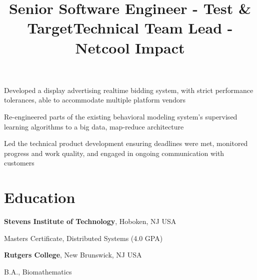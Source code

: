 \documentclass[margin,line]{resume}
\newenvironment{bullet-list}{
  \begin{list}{$\bullet$}{%
      \setlength{\itemsep}{0in}
      \setlength{\parsep}{0in} \setlength{\parskip}{0in}
      \setlength{\topsep}{0in} \setlength{\partopsep}{0in}
      \setlength{\leftmargin}{0.2in}}}{\end{list}}
\begin{document}
\begin{resume}
\title{Senior Software Engineer - Test \& Target}
\begin{position}
\vspace{-.3cm}
\begin{bullet-list}
\item Developed a display advertising realtime bidding system, with strict
performance tolerances, able to accommodate multiple platform vendors
\item Re-engineered parts of the existing behavioral modeling system's supervised
learning algorithms to a big data, map-reduce architecture
\end{bullet-list}
\end{position}

\title{Technical Team Lead - Netcool Impact}
\begin{position}
\vspace{-.3cm}
\begin{bullet-list}
\item Led the technical product development ensuring deadlines were met,
monitored progress and work quality, and engaged in ongoing communication
with customers
\end{bullet-list}
\end{position}

\section{\sc Education}
{\bf Stevens Institute of Technology}, Hoboken, NJ USA\\
\vspace*{-.1in}
\begin{list1}
\item[] Masters Certificate, Distributed Systems  (4.0 GPA)
\end{list1}

{\bf Rutgers College}, New Brunswick, NJ USA\\
\vspace*{-.1in}
\begin{list1}
\item[] B.A., Biomathematics
\end{list1}


\end{resume}
\end{document}
